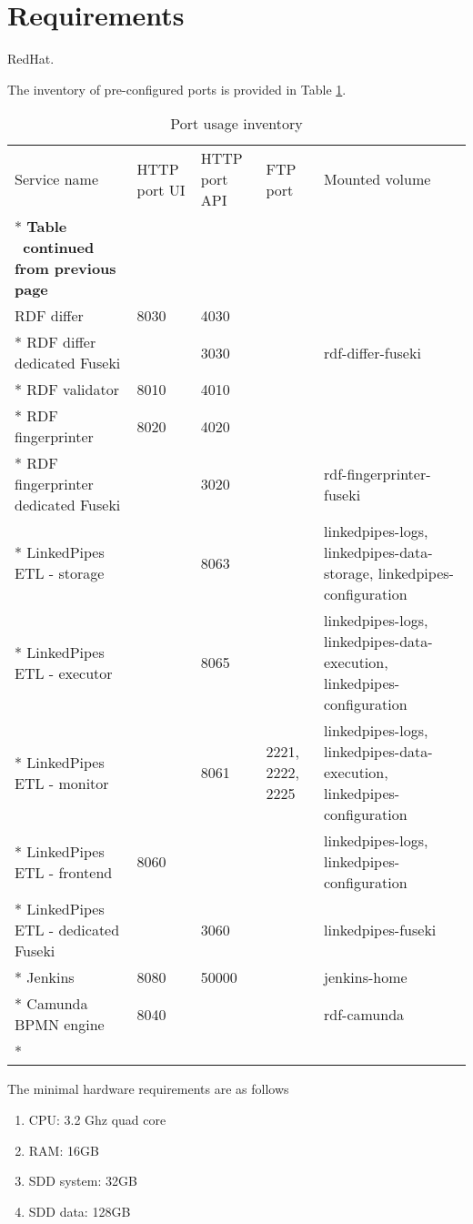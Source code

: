 \section{Requirements}
\label{sec:requirements}

	RedHat.
	
	The inventory of pre-configured ports is provided in Table \ref{tab:port-inventory}.

	\begin{longtable}[c]{@{}p{3.64cm}p{1.25cm}p{1.25cm}p{1.9cm}p{5cm}@{}}
		\toprule
		Service name & HTTP port UI & HTTP port API & FTP port & Mounted volume \\* \midrule
		\endfirsthead
		\multicolumn{5}{c}%
		{{\bfseries Table \thetable\ continued from previous page}} \\
		\endhead
		\bottomrule
		\endfoot
		\endlastfoot
		RDF differ & 8030 & 4030 &  &  \\* \hline
		RDF differ dedicated Fuseki &  & 3030 &  & rdf-differ-fuseki \\* \hline
		RDF validator & 8010 & 4010 &  &  \\* \hline
		RDF fingerprinter & 8020 & 4020 &  &  \\* \hline
		RDF fingerprinter dedicated Fuseki &  & 3020 &  & rdf-fingerprinter-fuseki \\* \hline
		LinkedPipes ETL - storage &  & 8063 &  & linkedpipes-logs, linkedpipes-data-storage, linkedpipes-configuration \\* \hline
		LinkedPipes ETL - executor &  & 8065 &  & linkedpipes-logs, linkedpipes-data-execution, linkedpipes-configuration \\* \hline
		LinkedPipes ETL - monitor &  & 8061 & 2221, 2222, 2225 & linkedpipes-logs, linkedpipes-data-execution, linkedpipes-configuration \\* \hline
		LinkedPipes ETL - frontend & 8060 &  &  & linkedpipes-logs, linkedpipes-configuration \\* \hline
		LinkedPipes ETL - dedicated Fuseki &  & 3060 &  & linkedpipes-fuseki \\* \hline
		Jenkins & 8080 & 50000 &  & jenkins-home \\* \hline
		Camunda BPMN engine & 8040 &  &  & rdf-camunda \\* \bottomrule
		\caption{Port usage inventory}
		\label{tab:port-inventory}\\
	\end{longtable}

	The minimal hardware requirements are as follows 
	\begin{enumerate}
		\item CPU: 3.2 Ghz quad core 
		\item RAM: 16GB 
		\item SDD system: 32GB 
		\item SDD data: 128GB 
	\end{enumerate}	

